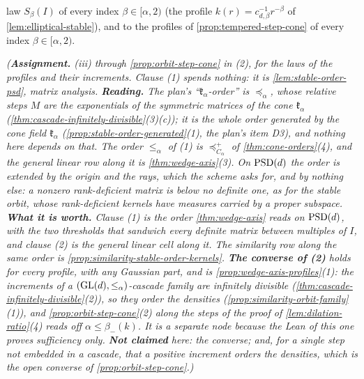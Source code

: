 \begin{proposition}
\begin{enumerate}
law $S_\beta(I)$ of every index $\beta \in [\alpha, 2)$ (the profile $k(r) = c_{d,\beta}^{-1}r^{-\beta}$ of
\ref{lem:elliptical-stable}), and to the profiles of \ref{prop:tempered-step-cone} of every index
$\beta \in [\alpha, 2)$.
\end{enumerate}
\statusA\quad{}\quad\emph{(\textbf{Assignment.} (iii) through
\ref{prop:orbit-step-cone} in (2), for the laws of the profiles and their increments. Clause (1) spends
nothing: it is \ref{lem:stable-order-psd}, matrix analysis. \textbf{Reading.} The plan's
``$\mathfrak k_\alpha$-order'' is $\preceq_\alpha$, whose relative steps $M$ are the exponentials of the symmetric
matrices of the cone $\mathfrak k_\alpha$ (\ref{thm:cascade-infinitely-divisible}(3)(c)); it is the whole order generated by
the cone field $\mathfrak k_\alpha$ (\ref{prop:stable-order-generated}(1), the plan's item D3), and nothing here depends
on that. The order $\le_\alpha$ of (1) is $\preceq^+_{C_\alpha}$ of \ref{thm:cone-orders}(4), and the general
linear row along it is \ref{thm:wedge-axis}(3). On $\mathrm{PSD}(d)$ the order is extended by the origin and the rays, which the scheme asks for, and by nothing
else: a nonzero rank-deficient matrix is below no definite one, as for the stable orbit, whose
rank-deficient kernels have \Levy{} measures carried by a proper subspace. \textbf{What it is worth.}
Clause (1) is the order \ref{thm:wedge-axis} reads on $\mathrm{PSD}(d)$, with the two thresholds that sandwich
every definite matrix between multiples of $I$, and clause (2) is the general linear cell along it. The
similarity row along the same order is \ref{prop:similarity-stable-order-kernels}. \textbf{The converse of
(2)} holds for every profile, with any Gaussian part, and is
\ref{prop:wedge-axis-profiles}(1): the increments of a $(\mathrm{GL}(d), \le_\alpha)$-cascade family are infinitely
divisible (\ref{thm:cascade-infinitely-divisible}(2)), so they order the \Levy{} densities
(\ref{prop:similarity-orbit-family}(1)), and \ref{prop:orbit-step-cone}(2) along the steps of the proof of
\ref{lem:dilation-ratio}(4) reads off $\alpha \le \beta_-(k)$. It
is a separate node because the Lean of this one proves sufficiency only. \textbf{Not claimed} here: the
converse; and, for a single step not embedded in a cascade, that a positive increment orders the densities,
which is the open converse of \ref{prop:orbit-step-cone}.)}
\end{proposition}

